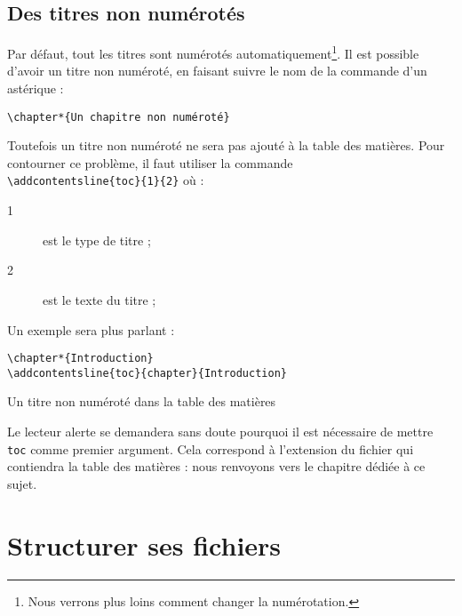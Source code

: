 \subsection{Des titres non numérotés}
Par défaut, tout les titres sont numérotés automatiquement\footnote{Nous verrons plus loins comment changer la numérotation.}. Il est possible d'avoir un titre non numéroté, en faisant suivre le nom de la commande d'un astérique :
\begin{verbatim}
\chapter*{Un chapitre non numéroté}
\end{verbatim}

Toutefois un titre non numéroté ne sera pas ajouté à la table des matières. Pour contourner ce problème, il faut utiliser la commande \\
\verb|\addcontentsline{toc}{1}{2}| où :
\begin{description}
	\item[1] est le type de titre ;
	\item[2] est le texte du titre ;
\end{description}

Un exemple sera plus parlant :

\begin{listing}[ht]
\begin{verbatim}
\chapter*{Introduction}
\addcontentsline{toc}{chapter}{Introduction}
\end{verbatim}
\caption{Un titre non numéroté dans la table des matières}
\end{listing}

\begin{anedocte}
Le lecteur alerte se demandera sans doute pourquoi il est nécessaire de mettre \verb|toc| comme premier argument. Cela correspond à l'extension du fichier qui contiendra la table des matières : nous renvoyons vers le chapitre dédiée à ce sujet.
\end{anedocte}

\section{Structurer ses fichiers}\label{inclusion}

